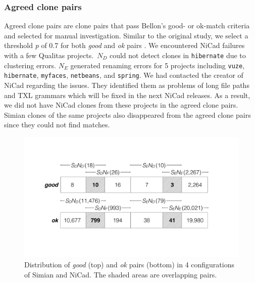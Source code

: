 \documentclass{sig-alternate-05-2015}
\begin{document}
\subsubsection{Agreed clone pairs}

Agreed clone pairs are clone pairs that pass Bellon's good- or ok-match criteria and selected for manual investigation. Similar to the original study, we select a threshold \textit{p} of 0.7 for both \textit{good} and \textit{ok} pairs \cite{Bellon2007}. %
We encountered NiCad failures with a few Qualitas projects.~$N_D$ could not detect clones in \texttt{hibernate} due to clustering errors. $N_E$ generated renaming errors for 5 projects including \texttt{vuze}, \texttt{hibernate}, \texttt{myfaces}, \texttt{netbeans}, and \texttt{spring}. We had contacted the creator of NiCad regarding the issues. They identified them as problems of long file paths and TXL grammars which will be fixed in the next NiCad releases. As a result, we did not have NiCad clones from these projects in the agreed clone pairs. Simian clones of the same projects also disappeared from the agreed clone pairs since they could not find matches.

\begin{table}
	\centering
	\caption{Distribution of the agreed clone pairs}
	\label{t_agreed_good_clone_pairs}
	\small
\end{table}

\begin{figure}
	\centering
	\includegraphics[width=\linewidth]{good-ok_pairs-crop}
	\caption{Distribution of \textit{good} (top) and \textit{ok} pairs (bottom) in 4 configurations of Simian and NiCad. The shaded areas are overlapping pairs.}
	\label{fig:good-ok-pairs}
\end{figure}
\end{document}
